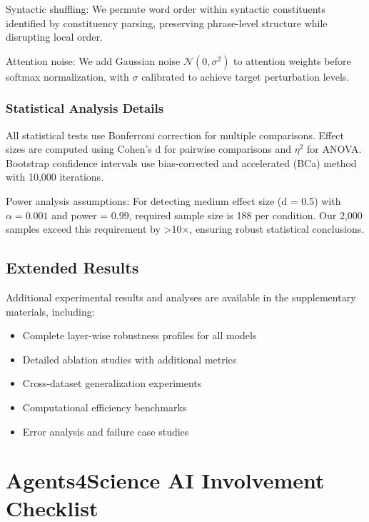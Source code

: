 \documentclass{article}
\begin{document}
Syntactic shuffling: We permute word order within syntactic constituents identified by constituency parsing, preserving phrase-level structure while disrupting local order.

Attention noise: We add Gaussian noise $\mathcal{N}(0, \sigma^2)$ to attention weights before softmax normalization, with $\sigma$ calibrated to achieve target perturbation levels.

\subsubsection{Statistical Analysis Details}

All statistical tests use Bonferroni correction for multiple comparisons. Effect sizes are computed using Cohen's d for pairwise comparisons and $\eta^2$ for ANOVA. Bootstrap confidence intervals use bias-corrected and accelerated (BCa) method with 10,000 iterations.

Power analysis assumptions: For detecting medium effect size (d = 0.5) with $\alpha = 0.001$ and power = 0.99, required sample size is 188 per condition. Our 2,000 samples exceed this requirement by >10×, ensuring robust statistical conclusions.

\subsection{Extended Results}

Additional experimental results and analyses are available in the supplementary materials, including:
\begin{itemize}
\item Complete layer-wise robustness profiles for all models
\item Detailed ablation studies with additional metrics
\item Cross-dataset generalization experiments
\item Computational efficiency benchmarks
\item Error analysis and failure case studies
\end{itemize}

\newpage

\section*{Agents4Science AI Involvement Checklist}
\end{document}
